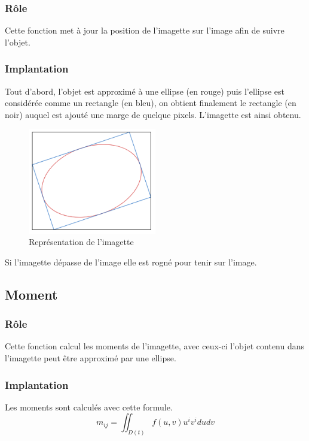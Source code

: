 \documentclass[11pt,a4paper]{report}
\begin{document}
		\subsubsection{Rôle}
			Cette fonction met à jour la position de l'imagette sur l'image afin de suivre l'objet.

		\subsubsection{Implantation}
			Tout d'abord, l'objet est approximé à une ellipse (en rouge) puis l'ellipse est considérée comme un rectangle (en bleu), on obtient finalement le rectangle (en noir) auquel est ajouté une marge de quelque pixels. L'imagette est ainsi obtenu.

			\begin{figure}[h]
			  \centering
		    \includegraphics[width=0.5\textwidth]{imagette.png}
				\caption{Représentation de l'imagette}
			\end{figure}

			Si l'imagette dépasse de l'image elle est rogné pour tenir sur l'image.

	\subsection*{Moment}
		\subsubsection{Rôle}
			Cette fonction calcul les moments de l'imagette, avec ceux-ci l'objet contenu dans l'imagette peut être approximé par une ellipse.

		\subsubsection{Implantation}
			Les moments sont calculés avec cette formule.
			\[ m_{ij} = \iint_{D(t)} f(u, v) u^i v^i du dv \]
\end{document}
